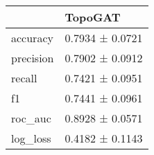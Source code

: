 \begin{tabular}{ll}
\toprule
 & TopoGAT \\
\midrule
accuracy & 0.7934 ± 0.0721 \\
precision & 0.7902 ± 0.0912 \\
recall & 0.7421 ± 0.0951 \\
f1 & 0.7441 ± 0.0961 \\
roc_auc & 0.8928 ± 0.0571 \\
log_loss & 0.4182 ± 0.1143 \\
\bottomrule
\end{tabular}
